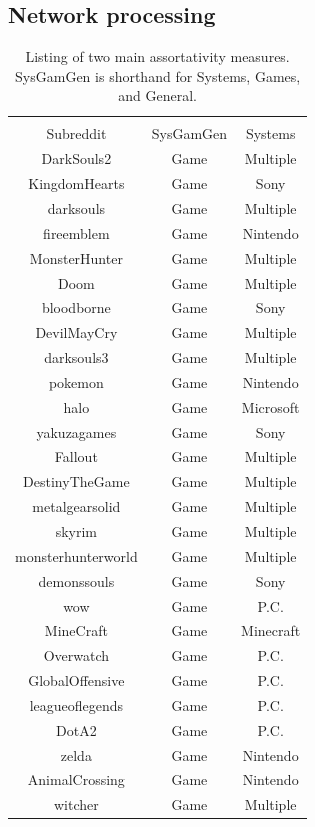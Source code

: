 \documentclass[12pt, a4paper]{article}
\begin{document}
\subsection{Network processing}
  \begin{longtable} {c c c}
    \caption{Listing of two main assortativity measures. SysGamGen is shorthand for Systems, Games, and General.}\label{tab:AssortSplit}\\
    \hline \\
    Subreddit & SysGamGen & Systems \\
    \hline
    \endhead
    \hline
    \endfoot
    DarkSouls2 & Game & Multiple \\
    KingdomHearts & Game & Sony \\
    darksouls & Game & Multiple \\
    fireemblem & Game & Nintendo \\
    MonsterHunter & Game & Multiple \\
    Doom & Game & Multiple \\
    bloodborne & Game & Sony \\
    DevilMayCry & Game & Multiple \\
    darksouls3 & Game & Multiple \\
    pokemon & Game & Nintendo \\
    halo & Game & Microsoft \\
    yakuzagames & Game & Sony \\
    Fallout & Game & Multiple \\
    DestinyTheGame & Game & Multiple \\
    metalgearsolid & Game & Multiple \\
    skyrim & Game & Multiple \\
    monsterhunterworld & Game & Multiple \\
    demonssouls & Game & Sony \\
    wow & Game & P.C. \\
    MineCraft & Game & Minecraft \\
    Overwatch & Game & P.C. \\
    GlobalOffensive & Game & P.C. \\
    leagueoflegends & Game & P.C. \\
    DotA2 & Game & P.C. \\
    zelda & Game & Nintendo \\
    AnimalCrossing & Game & Nintendo \\
    witcher & Game & Multiple \\

\end{longtable}
\end{document}
